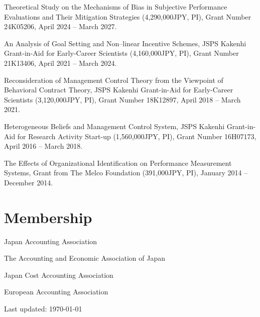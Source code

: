\documentclass[letterpaper,uplatex]{article}
\def\footerlink{http://jblevins.org/projects/cv-template/}
\renewenvironment{itemize}{
  \begin{list}{}{
    \setlength{\leftmargin}{1.5em}
  }
}{
  \end{list}
}
\begin{document}
\begin{itemize}
\item Theoretical Study on the Mechanisms of Bias in Subjective Performance Evaluations and Their Mitigation Strategies (4,290,000JPY, PI), Grant Number 24K05206, April 2024 -- March 2027.

\item An Analysis of Goal Setting and Non--linear Incentive Schemes, JSPS Kakenhi Grant-in-Aid for Early-Career Scientists (4,160,000JPY, PI), Grant Number 21K13406, April 2021 -- March 2024.

\item Reconsideration of Management Control Theory from the Viewpoint of Behavioral Contract Theory, JSPS Kakenhi Grant-in-Aid for Early-Career Scientists (3,120,000JPY, PI), Grant Number 18K12897, April 2018 -- March 2021.

\item Heterogeneous Beliefs and Management Control System, JSPS Kakenhi Grant-in-Aid for Research Activity Start-up (1,560,000JPY, PI), Grant Number 16H07173, April 2016 -- March 2018.

\item The Effects of Organizational Identification on Performance Measurement Systems, Grant from The Melco Foundation (391,000JPY, PI), January 2014 -- December 2014.
\end{itemize}

\section*{Membership}

\begin{itemize}
\item Japan Accounting Association
\item The Accounting and Economic Association of Japan
\item Japan Cost Accounting Association
\item European Accounting Association
\end{itemize}

\bigskip

\begin{center}
  \begin{footnotesize}
    Last updated: \today \\
  \end{footnotesize}
\end{center}
\end{document}
